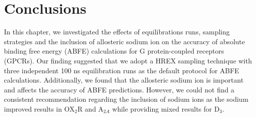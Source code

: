 \section{Conclusions}
In this chapter, we investigated the effects of equilibrations runs, sampling strategies and the inclusion of allosteric sodium ion on the accuracy of absolute binding free energy (ABFE) calculations for G protein-coupled receptors (GPCRs). Our finding suggested that we adopt a HREX sampling technique with three independent 100 ns equilibration runs as the default protocol for ABFE calculations. Additionally, we found that the allosteric sodium ion is important and affects the accuracy of ABFE predictions. However, we could not find a consistent recommendation regarding the inclusion of sodium ions as the sodium improved results in OX$_2$R and A$_{2A}$ while providing mixed results for D$_3$.

